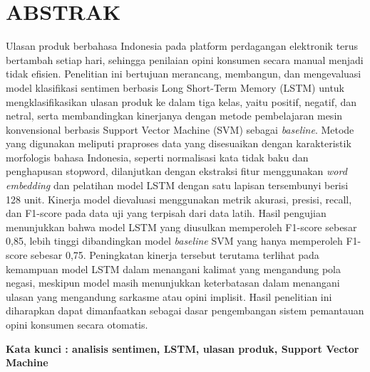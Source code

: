 
\chapter*{ABSTRAK}
Ulasan produk berbahasa Indonesia pada platform perdagangan
elektronik terus bertambah setiap hari, sehingga penilaian opini
konsumen secara manual menjadi tidak efisien. Penelitian ini
bertujuan merancang, membangun, dan mengevaluasi model klasifikasi
sentimen berbasis Long Short-Term Memory (LSTM) untuk
mengklasifikasikan ulasan produk ke dalam tiga kelas, yaitu positif,
negatif, dan netral, serta membandingkan kinerjanya dengan metode
pembelajaran mesin konvensional berbasis Support Vector Machine
(SVM) sebagai \textit{baseline}. Metode yang digunakan meliputi
praproses data yang disesuaikan dengan karakteristik morfologis
bahasa Indonesia, seperti normalisasi kata tidak baku dan penghapusan
stopword, dilanjutkan dengan ekstraksi fitur menggunakan
\textit{word embedding} dan pelatihan model LSTM dengan satu lapisan
tersembunyi berisi 128 unit. Kinerja model dievaluasi menggunakan
metrik akurasi, presisi, recall, dan F1-score pada data uji yang
terpisah dari data latih. Hasil pengujian menunjukkan bahwa model
LSTM yang diusulkan memperoleh F1-score sebesar 0,85, lebih tinggi
dibandingkan model \textit{baseline} SVM yang hanya memperoleh
F1-score sebesar 0,75. Peningkatan kinerja tersebut terutama terlihat
pada kemampuan model LSTM dalam menangani kalimat yang mengandung
pola negasi, meskipun model masih menunjukkan keterbatasan dalam
menangani ulasan yang mengandung sarkasme atau opini implisit. Hasil
penelitian ini diharapkan dapat dimanfaatkan sebagai dasar
pengembangan sistem pemantauan opini konsumen secara otomatis.

\baselineskip
\noindent\textbf{Kata kunci : analisis sentimen, LSTM, ulasan produk,
Support Vector Machine}
